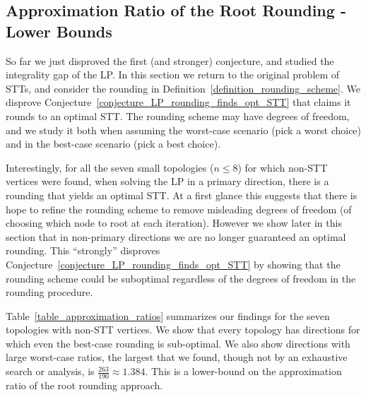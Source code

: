 \subsection{Approximation Ratio of the Root Rounding - Lower Bounds}
\label{subsection_approximation_ratio}

So far we just disproved the first (and stronger) conjecture, and studied the integrality gap of the LP. In this section we return to the original problem of STTs, and consider the rounding in Definition~\ref{definition_rounding_scheme}. We disprove Conjecture~\ref{conjecture_LP_rounding_finds_opt_STT} that claims it rounds to an optimal STT. The rounding scheme may have degrees of freedom, and we study it both when assuming the worst-case scenario (pick a worst choice) and in the best-case scenario (pick a best choice).

Interestingly, for all the seven small topologies ($n \le 8$) for which non-STT vertices were found, when solving the LP in a primary direction, there is a rounding that yields an optimal STT. At a first glance this suggests that there is hope to refine the rounding scheme to remove misleading degrees of freedom (of choosing which node to root at each iteration). However we show later in this section that  in non-primary directions we are no longer guaranteed an optimal rounding. This ``strongly'' disproves Conjecture~\ref{conjecture_LP_rounding_finds_opt_STT} by showing that the rounding scheme could be suboptimal regardless of the degrees of freedom in the rounding procedure.

Table~\ref{table_approximation_ratios} summarizes our findings for the seven topologies with non-STT vertices. We show that every topology has directions for which even the best-case rounding is sub-optimal. We also show directions with large worst-case ratios, the largest that we found, though not by an exhaustive search or analysis, is $\frac{263}{190} \approx 1.384$. This is a lower-bound on the approximation ratio of the root rounding approach.

